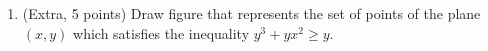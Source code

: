 \documentclass[]{exam}
\begin{document}
\begin{enumerate}



\item (Extra, 5 points) Draw figure that represents the set of points of the plane $(x,y)$ which satisfies the inequality $y^3+yx^2 \ge y$.


\end{enumerate}
\end{document}
